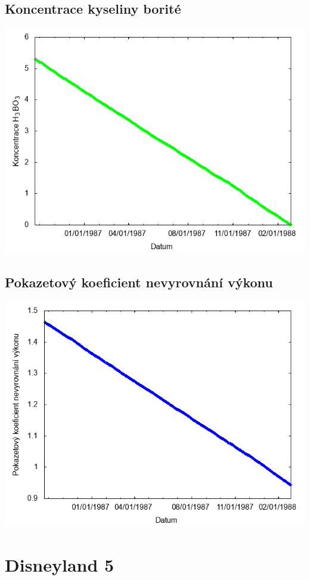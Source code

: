 \documentclass[a4paper,twoside,11pt]{article}
\begin{document}
\subsection*{Koncentrace kyseliny borité}
\begin{center}
\includegraphics[width=.8\textwidth]{graphs/Disneyland_04_bc.png}
\end{center}

\subsection*{Pokazetový koeficient nevyrovnání výkonu}
\begin{center}
\includegraphics[width=.8\textwidth]{graphs/Disneyland_04_fha.png}
\end{center}

\newpage
\section*{Disneyland 5}
\end{document}
